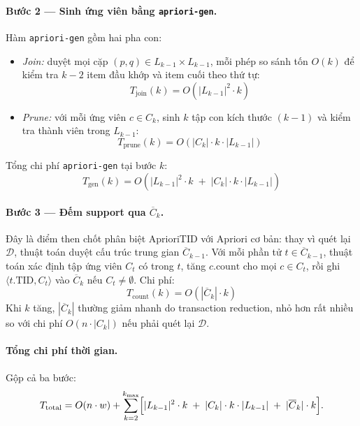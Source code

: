 \paragraph{Bước 2 — Sinh ứng viên bằng \texttt{apriori-gen}.}
Hàm \texttt{apriori-gen} gồm hai pha con:
\begin{itemize}[nosep,topsep=2pt]
    \item \textit{Join:} duyệt mọi cặp $(p,q) \in L_{k-1} \times L_{k-1}$, mỗi phép so sánh tốn $O(k)$ để kiểm tra $k{-}2$ item đầu khớp và item cuối theo thứ tự:
    \begin{equation}
        \label{eq:equation-1-5b}
        T_{\text{join}}(k) = O\!\left(|L_{k-1}|^2 \cdot k\right)
    \end{equation}
    \item \textit{Prune:} với mỗi ứng viên $c \in C_k$, sinh $k$ tập con kích thước $(k{-}1)$ và kiểm tra thành viên trong $L_{k-1}$:
    \begin{equation}
        \label{eq:equation-1-5c}
        T_{\text{prune}}(k) = O\!\left(|C_k| \cdot k \cdot |L_{k-1}|\right)
    \end{equation}
\end{itemize}
Tổng chi phí \texttt{apriori-gen} tại bước $k$:
\begin{equation}
    \label{eq:equation-1-5d}
    T_{\text{gen}}(k) = O\!\left(|L_{k-1}|^2 \cdot k \;+\; |C_k| \cdot k \cdot |L_{k-1}|\right)
\end{equation}

\paragraph{Bước 3 — Đếm support qua $\overline{C}_k$.}
Đây là điểm then chốt phân biệt AprioriTID với Apriori cơ bản: thay vì quét lại $\mathcal{D}$, thuật toán duyệt cấu trúc trung gian $\overline{C}_{k-1}$. Với mỗi phần tử $t \in \overline{C}_{k-1}$, thuật toán xác định tập ứng viên $C_t$ có trong $t$, tăng $c.\text{count}$ cho mọi $c \in C_t$, rồi ghi $\langle t.\text{TID}, C_t \rangle$ vào $\overline{C}_k$ nếu $C_t \neq \emptyset$. Chi phí:
\begin{equation}
    \label{eq:equation-1-5e}
    T_{\text{count}}(k) = O\!\left(|\overline{C}_k| \cdot k\right)
\end{equation}
Khi $k$ tăng, $|\overline{C}_k|$ thường giảm nhanh do transaction reduction, nhỏ hơn rất nhiều so với chi phí $O(n \cdot |C_k|)$ nếu phải quét lại $\mathcal{D}$.

\paragraph{Tổng chi phí thời gian.}
Gộp cả ba bước:
\begin{equation}
    \label{eq:equation-1-5}
    T_{\text{total}} = O(n \cdot w)
    + \sum_{k=2}^{k_{\max}}
        \Bigl[
        |L_{k-1}|^2 \cdot k
        \;+\; |C_k| \cdot k \cdot |L_{k-1}|
        \;+\; |\overline{C}_k| \cdot k
        \Bigr].
\end{equation}

